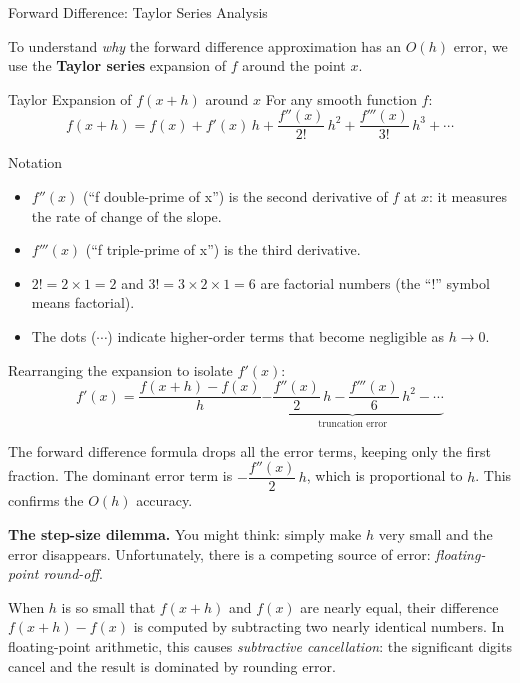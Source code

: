\documentclass[aspectratio=169,10pt]{beamer}
\begin{document}
\begin{frame}[allowframebreaks]{Forward Difference: Taylor Series Analysis}

  To understand \emph{why} the forward difference approximation has an
  $O(h)$ error, we use the \textbf{Taylor series} expansion of $f$ around
  the point $x$.

  \begin{block}{Taylor Expansion of $f(x+h)$ around $x$}
    For any smooth function $f$:
    \[
      f(x+h)
      = f(x)
      + f'(x)\,h
      + \frac{f''(x)}{2!}\,h^2
      + \frac{f'''(x)}{3!}\,h^3
      + \cdots
    \]
  \end{block}

  \begin{block}{Notation}
    \begin{itemize}
      \item $f''(x)$ (``f double-prime of x'') is the second derivative
            of $f$ at $x$: it measures the rate of change of the slope.
      \item $f'''(x)$ (``f triple-prime of x'') is the third derivative.
      \item $2! = 2 \times 1 = 2$ and $3! = 3 \times 2 \times 1 = 6$
            are factorial numbers (the ``$!$'' symbol means factorial).
      \item The dots ($\cdots$) indicate higher-order terms that become
            negligible as $h \to 0$.
    \end{itemize}
  \end{block}

  Rearranging the expansion to isolate $f'(x)$:
  \[
    f'(x)
    = \frac{f(x+h) - f(x)}{h}
    \underbrace{- \frac{f''(x)}{2}\,h - \frac{f'''(x)}{6}\,h^2 - \cdots}_{\text{truncation error}}
  \]

  The forward difference formula drops all the error terms, keeping only
  the first fraction.  The dominant error term is $-\dfrac{f''(x)}{2}\,h$,
  which is proportional to $h$.  This confirms the $O(h)$ accuracy.

  \framebreak

  \textbf{The step-size dilemma.}
  You might think: simply make $h$ very small and the error disappears.
  Unfortunately, there is a competing source of error: \emph{floating-point
  round-off}.

  When $h$ is so small that $f(x+h)$ and $f(x)$ are nearly equal, their
  difference $f(x+h) - f(x)$ is computed by subtracting two nearly
  identical numbers.  In floating-point arithmetic, this causes
  \emph{subtractive cancellation}: the significant digits cancel and
  the result is dominated by rounding error.


\end{frame}
\end{document}
